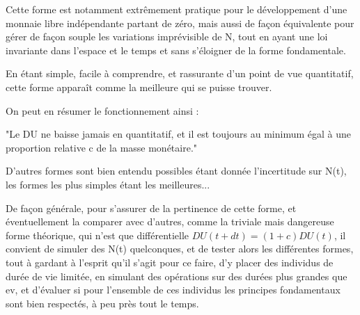 \documentclass[a4paper,oneside,12pt]{article}
\begin{document}
Cette forme est notamment extrêmement pratique pour le développement d'une monnaie libre indépendante partant de zéro, mais aussi de façon équivalente pour gérer de façon souple les variations imprévisible de N, tout en ayant une loi invariante dans l'espace et le temps et sans s'éloigner de la forme fondamentale.

En étant simple, facile à comprendre, et rassurante d'un point de vue quantitatif, cette forme apparaît comme la meilleure qui se puisse trouver.

On peut en résumer le fonctionnement ainsi :

"Le DU ne baisse jamais en quantitatif, et il est toujours au minimum égal à une proportion relative c de la masse monétaire."

D'autres formes sont bien entendu possibles étant donnée l'incertitude sur N(t), les formes les plus simples étant les meilleures...

De façon générale, pour s'assurer de la pertinence de cette forme, et éventuellement la comparer avec d'autres, comme la triviale mais dangereuse forme théorique, qui n'est que différentielle $DU(t+dt)=(1+c)DU(t)$, il convient de simuler des N(t) quelconques, et de tester alors les différentes formes, tout à gardant à l'esprit qu'il s'agit pour ce faire, d'y placer des individus de durée de vie limitée, en simulant des opérations sur des durées plus grandes que ev, et d'évaluer si pour l'ensemble de ces individus les principes fondamentaux sont bien respectés, à peu près tout le temps.
\end{document}
